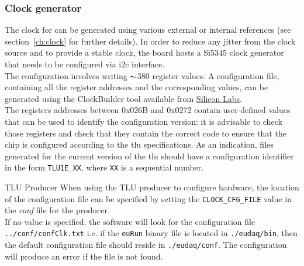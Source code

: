 \subsubsection{Clock generator}
The clock for \brd can be generated using various external or internal references (see section~\ref{ch:clock} for further details). In order to reduce any jitter from the clock source and to provide a stable clock, the board hosts a Si5345 clock generator that needs to be configured via \gls{i2c} interface.\\
The configuration involves writing $\thicksim$380 register values. A configuration file, containing all the register addresses and the corresponding values, can be generated using the ClockBuilder tool available from \href{http://www.enclustra.com/en/home/}{Silicon Labs}.\\
The registers addresses between 0x026B and 0x0272 contain user-defined values that can be used to identify the configuration version: it is advisable to check those registers and check that they contain the correct code to ensure that the chip is configured according to the \gls{tlu} specifications. As an indication, files generated for the current version of the \gls{tlu} should have a configuration identifier in the form \verb|TLU1E_XX|, where \verb|XX| is a sequential number.\\
\begin{alertinfo}{TLU Producer}
    When using the TLU producer to configure hardware, the location of the configuration file can be specified by setting the \texttt{CLOCK\_CFG\_FILE} value in the \emph{conf} file for the producer.\\
    If no value is specified, the software will look for the configuration file \texttt{../conf/confClk.txt} i.e. if the \texttt{euRun} binary file is located in \texttt{./eudaq/bin}, then the default configuration file should reside in \texttt{./eudaq/conf}. The configuration will produce an error if the file is not found.
\end{alertinfo}
